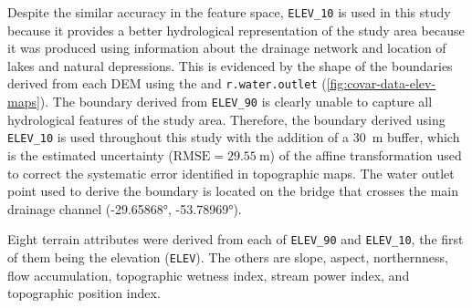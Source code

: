 
Despite the similar accuracy in the feature space, \texttt{ELEV\_10} is used in this study 
because it provides a better hydrological representation of the study area because it was 
produced using information about the drainage network and location of lakes and natural depressions. 
This is evidenced by the shape of the boundaries derived from each DEM using the  
and \texttt{r.water.outlet} (\autoref{fig:covar-data-elev-maps}). The boundary derived from 
\texttt{ELEV\_90} is clearly unable to capture all hydrological features of the study area. 
Therefore, the boundary derived using \texttt{ELEV\_10} is used throughout this study with the 
addition of a \SI{30}{\metre} buffer, which is the estimated uncertainty 
($\text{RMSE} = \SI{29.55}{\metre}$) of the affine transformation used to correct the systematic error 
identified in topographic maps. The water outlet point used to derive the boundary is located on the 
bridge that crosses the main drainage channel (\ang{-29.65868}, \ang{-53.78969}).


Eight terrain attributes were derived from each of \texttt{ELEV\_90} and \texttt{ELEV\_10}, the 
first of them being the elevation (\texttt{ELEV}). The others are slope, aspect, northernness, flow 
accumulation, topographic wetness index, stream power index, and topographic position index.


